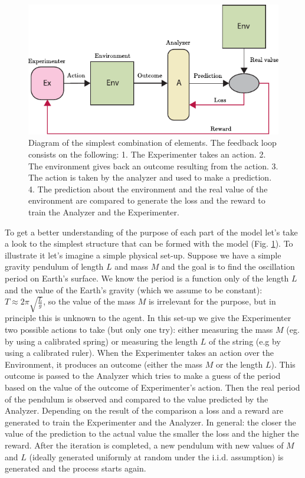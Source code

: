 \documentclass[11pt,a4paper,twoside]{report}
\newcommand{\+}{\textnormal{+} }
\theoremstyle{definition}
\numberwithin{equation}{chapter}
\begin{document}
\begin{figure}
  \centering
  \includegraphics{figures/SimpleSetUp.pdf}
  \caption{Diagram of the simplest combination of elements. The feedback loop
  consists on the following: 1. The Experimenter takes an action. 2. The
  environment gives back an outcome resulting from the action. 3. The action is
  taken by the analyzer and used to make a prediction. 4. The prediction about
  the environment and the real value of the environment are compared to generate
  the loss and the reward to train the Analyzer and the Experimenter.}
  \label{fig:simplesetup}
\end{figure}

To get a better understanding of the purpose of each part of the model let's
take a look to the simplest structure that can be formed with the model (Fig.
\ref{fig:simplesetup}). To illustrate it let's imagine a simple physical set-up.
Suppose we have a simple gravity pendulum of length $L$ and mass $M$ and the
goal is to find the oscillation period on Earth's surface. We know the period is
a function only of the length $L$ and the value of the Earth's gravity (which we
assume to be constant): $T \approx 2\pi\sqrt{\frac{L}{g}}$, so the value of the
mass $M$ is irrelevant for the purpose, but in principle this is unknown to the
agent. In this set-up we give the Experimenter two possible actions to take (but
only one try): either measuring the mass $M$ (eg. by using a calibrated spring)
or measuring the length $L$ of the string (e.g by using a calibrated ruler).
When the Experimenter takes an action over the Environment, it produces an
outcome (either the mass $M$ or the length $L$). This outcome is passed to the
Analyzer which tries to make a guess of the period based on the value of the
outcome of Experimenter's action. Then the real period of the pendulum is
observed and compared to the value predicted by the Analyzer. Depending on the
result of the comparison a loss and a reward are generated to train the
Experimenter and the Analyzer. In general: the closer the value of the
prediction to the actual value the smaller the loss and the higher the reward.
After the iteration is completed, a new pendulum with new values of $M$ and $L$
(ideally generated uniformly at random under the i.i.d. assumption) is generated
and the process starts again.
\end{document}
